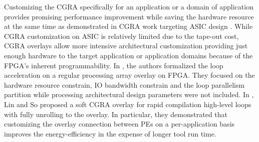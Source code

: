 Customizing the CGRA specifically for an application or a domain of application provides promising performance improvement while saving the hardware resource at the same time as demonstrated in CGRA work targeting ASIC design \cite{compton2001totem, zhou2014application, miniskar2014retargetable}. While CGRA customization on ASIC is relatively limited due to the tape-out cost, CGRA overlays allow more intensive architectural customization providing just enough hardware to the target application or application domains because of the FPGA's inherent programmability. In \cite{bondhugula2007automatic}, the authors formalized the loop acceleration on a regular processing array overlay on FPGA. They focused on the hardware resource constrain, IO bandwidth constrain and the loop parallelism partition while processing architectural design parameters were not included. In \cite{lin2012energy}, Lin and So proposed a soft CGRA overlay for rapid compilation high-level loops with fully unrolling to the overlay. In particular, they demonstrated that customizing the overlay connection between PEs on a per-application basis improves the energy-efficiency in the expense of longer tool run time.

